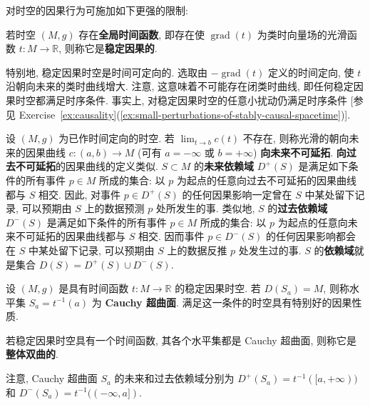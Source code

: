 对时空的因果行为可施加如下更强的限制:

\begin{RiemannDefinition}\label{def:stable-causality}
若时空 $(M,g)$ 存在\textbf{全局时间函数}, 即存在使 $\operatorname{grad}(t)$ 为类时向量场的光滑函数 $t:M\to\mathbb{R}$, 则称它是\textbf{稳定因果的}.
\end{RiemannDefinition}

特别地, 稳定因果时空是时间可定向的. 选取由 $-\operatorname{grad}(t)$ 定义的时间定向, 使 $t$ 沿朝向未来的类时曲线增大. 注意, 这意味着不可能存在闭类时曲线, 即任何稳定因果时空都满足时序条件. 事实上, 对稳定因果时空的任意小扰动仍满足时序条件 [参见 Exercise~\ref{ex:causality}(\ref{ex:small-perturbations-of-stably-causal-spacetime})].

设 $(M,g)$ 为已作时间定向的时空. 若 $\lim_{t\to b}c(t)$ 不存在, 则称光滑的朝向未来的因果曲线 $c:(a,b)\to M$ (可有 $a=-\infty$ 或 $b=+\infty$) \textbf{向未来不可延拓}. \textbf{向过去不可延拓}的因果曲线的定义类似. $S\subset M$ 的\textbf{未来依赖域} $D^+(S)$ 是满足如下条件的所有事件 $p\in M$ 所成的集合: 以 $p$ 为起点的任意向过去不可延拓的因果曲线都与 $S$ 相交. 因此, 对事件 $p\in D^+(S)$ 的任何因果影响一定曾在 $S$ 中某处留下记录, 可以预期由 $S$ 上的数据预测 $p$ 处所发生的事. 类似地, $S$ 的\textbf{过去依赖域} $D^-(S)$ 是满足如下条件的所有事件 $p\in M$ 所成的集合: 以 $p$ 为起点的任意向未来不可延拓的因果曲线都与 $S$ 相交. 因而事件 $p\in D^-(S)$ 的任何因果影响都会在 $S$ 中某处留下记录, 可以预期由 $S$ 上的数据反推 $p$ 处发生过的事. $S$ 的\textbf{依赖域}就是集合 $D(S)=D^+(S)\cup D^-(S)$.

设 $(M,g)$ 是具有时间函数 $t:M\to\mathbb{R}$ 的稳定因果时空. 若 $D(S_a)=M$, 则称水平集 $S_a=t^{-1}(a)$ 为 \textbf{Cauchy 超曲面}. 满足这一条件的时空具有特别好的因果性质.

\begin{RiemannDefinition}\label{def:globally-hyperbolic-spacetime}
若稳定因果时空具有一个时间函数, 其各个水平集都是 Cauchy 超曲面, 则称它是\textbf{整体双曲的}.
\end{RiemannDefinition}

注意, Cauchy 超曲面 $S_a$ 的未来和过去依赖域分别为 $D^+(S_a)=t^{-1}([a,+\infty))$ 和 $D^-(S_a)=t^{-1}((-\infty,a])$.

